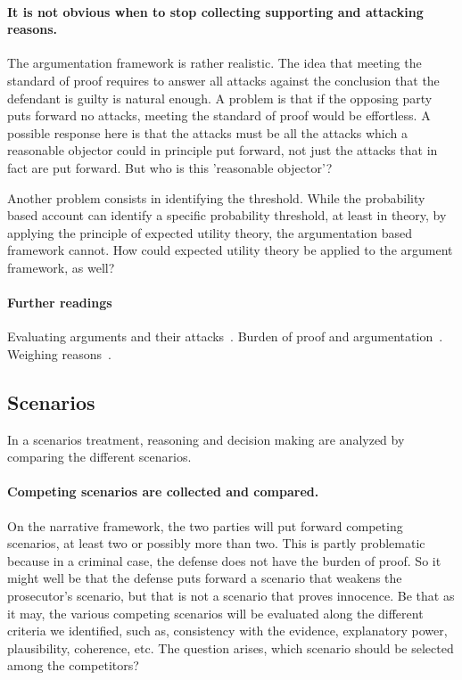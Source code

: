 \documentclass[10pt]{article}
\begin{document}
\paragraph{It is not obvious when to stop collecting supporting and attacking reasons.}


The argumentation framework is rather realistic. The idea that meeting the standard of proof requires to answer all 
attacks against the conclusion that the defendant is guilty 
is natural enough. A problem is that if the opposing party puts forward no attacks, meeting the standard of proof would be effortless. 
A possible response here is that the attacks must be all the attacks which a reasonable objector could in principle put forward, not just 
the attacks that in fact are put forward. %
But who is this 'reasonable objector'?

Another problem consists in identifying the threshold. While the probability based account can identify a specific probability threshold, 
at least in theory, by applying the principle of expected utility theory, the argumentation based framework cannot. 
How could expected utility theory be applied to the argument framework, as well?



\paragraph{Further readings}
Evaluating arguments and their attacks~\citep{pollock1995,dung1995}. Burden of proof and argumentation~\citep{gordonEtal2007,gordon2009,prakkenSartor2007, prakken2009}. Weighing reasons~\citep{hage1997}.



\subsection{Scenarios}

In a scenarios treatment, reasoning and decision making are analyzed by comparing the different scenarios.

\paragraph{Competing scenarios are collected and compared.}

On the narrative framework, the two parties will put forward competing scenarios, at least two or possibly more than two. This is partly problematic because in a criminal case, the defense does not have the burden of proof. So it might well be that the defense puts forward a scenario that weakens the prosecutor's scenario, but that is not 
a scenario that proves innocence. Be that as it may, the various competing scenarios will be evaluated along the different criteria we identified, such as, consistency with the evidence, explanatory power, plausibility, coherence, etc. The question arises, which scenario should be selected among the competitors?
\end{document}
